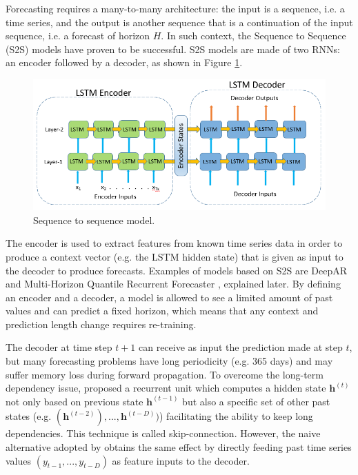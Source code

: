 \documentclass[a4paper, 12pt]{article} %
\begin{document}
	Forecasting requires a many-to-many architecture: the input is a sequence, i.e. a time series, and the output is another sequence that is a continuation of the input sequence, i.e. a forecast of horizon $H$. In such context, the Sequence to Sequence (S2S) \cite{seq2seq} models have proven to be successful. S2S models are made of two RNNs: an encoder followed by a decoder, as shown in Figure \ref{fig:seq2seq}.
	\begin{figure}
		\includegraphics[width=\linewidth]{img/seq2seq.png}
		\caption{Sequence to sequence model.}
		\label{fig:seq2seq}
	\end{figure}
	The encoder is used to extract features from known time series data in order to produce a context vector (e.g. the LSTM hidden state) that is given as input to the decoder to produce forecasts. Examples of models based on S2S are DeepAR \cite{DeepAR} and Multi-Horizon Quantile Recurrent Forecaster \cite{MQCNN}, explained later. By defining an encoder and a decoder, a model is allowed to see a limited amount of past values and can predict a fixed horizon, which means that any context and prediction length change requires re-training. 
	
	The decoder at time step $t+1$ can receive as input the prediction made at step $t$, but many forecasting problems have long periodicity (e.g. 365 days) and may suffer memory loss during forward propagation. To overcome the long-term dependency issue, \cite{NARX} proposed a recurrent unit which computes a hidden state $\pmb{h}^{(t)}$ not only based on previous state $\pmb{h}^{(t-1)}$ but also a specific set of other past states (e.g. $(\pmb{h}^{(t-2)}), ..., \pmb{h}^{(t-D)})$) facilitating the ability to keep long dependencies. This technique is called skip-connection. However, the naive alternative adopted by \cite{DeepAR, MQCNN} obtains the same effect by directly feeding past time series values $(y_{t-1}, ..., y_{t-D})$ as feature inputs to the decoder.
	
\end{document}
